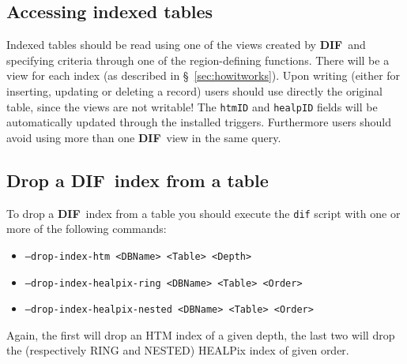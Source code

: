 \documentclass[10pt,titlepage]{article}
\newcommand{\dif}{\textbf{\small DIF}}
\begin{document}
%
\subsection{Accessing indexed tables}
Indexed tables should be read using one of the views created by \dif\
and specifying criteria through one of the region-defining
functions. There will be a view for each index (as described in
\S\ \ref{sec:howitworks}). Upon writing (either for inserting,
updating or deleting a record) users should use directly the original
table, since the views are not writable! The {\tt htmID} and
{\tt healpID} fields will be automatically updated through the installed
triggers. Furthermore users should avoid using more than one \dif\ view
in the same query.
%

%
\subsection{Drop a \dif\ index from a table}
\label{sec-removedifindex}
To drop a \dif\ index from a table you should execute the {\tt dif}
script with one or more of the following commands:
\begin{itemize}
\item {\tt --drop-index-htm <DBName> <Table> <Depth>}
\item {\tt --drop-index-healpix-ring <DBName> <Table> <Order>}
\item {\tt --drop-index-healpix-nested <DBName> <Table> <Order>}
\end{itemize}
Again, the first will drop an HTM index of a given depth, the last
two will drop the (respectively RING and NESTED) HEALPix index of
given order.

\end{document}
